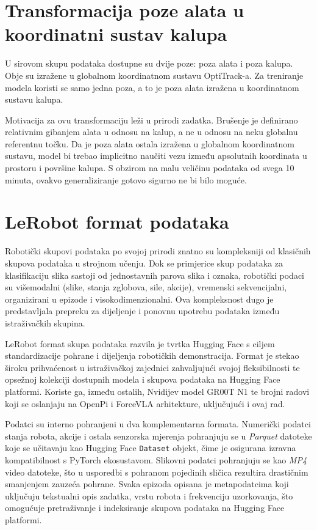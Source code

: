 \documentclass[times, utf8, diplomski]{fer}
\begin{document}
\section{Transformacija poze alata u koordinatni sustav kalupa}

U sirovom skupu podataka dostupne su dvije poze: poza alata i poza kalupa. Obje su izražene u globalnom koordinatnom sustavu OptiTrack-a. Za treniranje modela koristi se samo jedna poza, a to je poza alata izražena u koordinatnom sustavu kalupa.

Motivacija za ovu transformaciju leži u prirodi zadatka. Brušenje je definirano relativnim gibanjem alata u odnosu na kalup, a ne u odnosu na neku globalnu referentnu točku. Da je poza alata ostala izražena u globalnom koordinatnom sustavu, model bi trebao implicitno naučiti vezu između apsolutnih koordinata u prostoru i površine kalupa. S obzirom na malu veličinu podataka od svega 10 minuta, ovakvo generaliziranje gotovo sigurno ne bi bilo moguće.

\section{LeRobot format podataka}

Robotički skupovi podataka po svojoj prirodi znatno su kompleksniji od klasičnih skupova podataka u strojnom učenju. Dok se primjerice skup podataka za klasifikaciju slika sastoji od jednostavnih parova slika i oznaka, robotički podaci su višemodalni (slike, stanja zglobova, sile, akcije), vremenski sekvencijalni, organizirani u epizode i visokodimenzionalni. Ova kompleksnost dugo je predstavljala prepreku za dijeljenje i ponovnu upotrebu podataka između istraživačkih skupina.

LeRobot \cite{cadene2024lerobot} format skupa podataka razvila je tvrtka Hugging Face s ciljem standardizacije pohrane i dijeljenja robotičkih demonstracija. Format je stekao široku prihvaćenost u istraživačkoj zajednici zahvaljujući svojoj fleksibilnosti te opsežnoj kolekciji dostupnih modela i skupova podataka na Hugging Face platformi. Koriste ga, između ostalih, Nvidijev model GR00T N1 te brojni radovi koji se oslanjaju na OpenPi i ForceVLA arhitekture, uključujući i ovaj rad.

Podatci su interno pohranjeni u dva komplementarna formata. Numerički podatci stanja robota, akcije i ostala senzorska mjerenja pohranjuju se u \textit{Parquet} datoteke koje se učitavaju kao Hugging Face \texttt{Dataset} objekt, čime je osigurana izravna kompatibilnost s PyTorch ekosustavom. Slikovni podatci pohranjuju se kao \textit{MP4} video datoteke, što u usporedbi s pohranom pojedinih sličica rezultira drastičnim smanjenjem zauzeća pohrane. Svaka epizoda opisana je metapodatcima koji uključuju tekstualni opis zadatka, vrstu robota i frekvenciju uzorkovanja, što omogućuje pretraživanje i indeksiranje skupova podataka na Hugging Face platformi.
\end{document}

